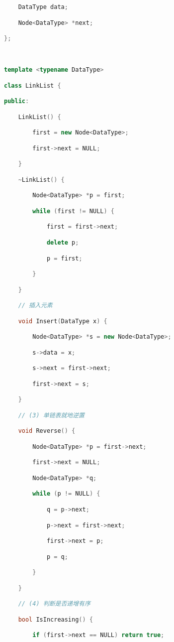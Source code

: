\begin{lstlisting}[language=C++]
    DataType data;

    Node<DataType> *next;

};

  

template <typename DataType>

class LinkList {

public:

    LinkList() {

        first = new Node<DataType>;

        first->next = NULL;

    }

    ~LinkList() {

        Node<DataType> *p = first;

        while (first != NULL) {

            first = first->next;

            delete p;

            p = first;

        }

    }

    // 插入元素

    void Insert(DataType x) {

        Node<DataType> *s = new Node<DataType>;

        s->data = x;

        s->next = first->next;

        first->next = s;

    }

    // (3) 单链表就地逆置

    void Reverse() {

        Node<DataType> *p = first->next;

        first->next = NULL;

        Node<DataType> *q;

        while (p != NULL) {

            q = p->next;

            p->next = first->next;

            first->next = p;

            p = q;

        }

    }

    // (4) 判断是否递增有序

    bool IsIncreasing() {

        if (first->next == NULL) return true;


\end{lstlisting}
